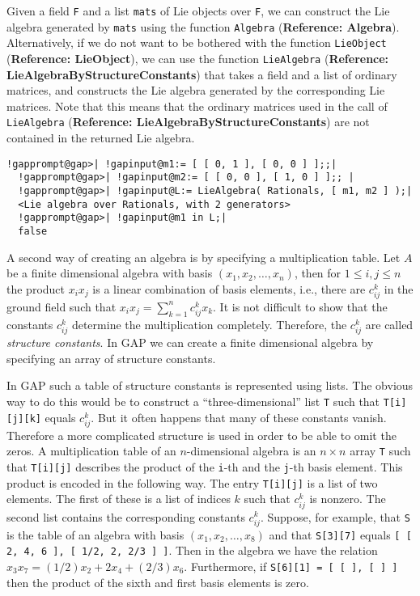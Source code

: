 \documentclass[a4paper,11pt]{report}
\begin{document}
{{ Given a field \texttt{F} and a list \texttt{mats} of Lie objects over \texttt{F}, we can construct the Lie algebra generated by \texttt{mats} using the function \texttt{Algebra} (\textbf{Reference: Algebra}). Alternatively, if we do not want to be bothered with the function \texttt{LieObject} (\textbf{Reference: LieObject}), we can use the function \texttt{LieAlgebra} (\textbf{Reference: LieAlgebraByStructureConstants}) that takes a field and a list of ordinary matrices, and constructs the Lie
algebra generated by the corresponding Lie matrices. Note that this means that
the ordinary matrices used in the call of \texttt{LieAlgebra} (\textbf{Reference: LieAlgebraByStructureConstants}) are not contained in the returned Lie algebra. 

 
\begin{Verbatim}[commandchars=!@|,fontsize=\small,frame=single,label=Example]
  !gapprompt@gap>| !gapinput@m1:= [ [ 0, 1 ], [ 0, 0 ] ];;|
  !gapprompt@gap>| !gapinput@m2:= [ [ 0, 0 ], [ 1, 0 ] ];; |
  !gapprompt@gap>| !gapinput@L:= LieAlgebra( Rationals, [ m1, m2 ] );|
  <Lie algebra over Rationals, with 2 generators>
  !gapprompt@gap>| !gapinput@m1 in L;|
  false
\end{Verbatim}
 

 A second way of creating an algebra is by specifying a multiplication table.
Let $A$ be a finite dimensional algebra with basis $(x_1, x_2, \ldots, x_n)$, then for $1 \leq i, j \leq n$ the product $x_i x_j$ is a linear combination of basis elements, i.e., there are $c_{ij}^k$ in the ground field such that $x_i x_j = \sum_{k=1}^n c_{ij}^k x_k.$ It is not difficult to show that the constants $c_{ij}^k$ determine the multiplication completely. Therefore, the $c_{ij}^k$ are called \emph{structure constants}. In \textsf{GAP} we can create a finite dimensional algebra by specifying an array of structure
constants. 

 In \textsf{GAP} such a table of structure constants is represented using lists. The obvious
way to do this would be to construct a ``three-dimensional'' list \texttt{T} such that \texttt{T[i][j][k]} equals $c_{ij}^k$. But it often happens that many of these constants vanish. Therefore a more
complicated structure is used in order to be able to omit the zeros. A
multiplication table of an $n$-dimensional algebra is an $n \times n$ array \texttt{T} such that \texttt{T[i][j]} describes the product of the \texttt{i}-th and the \texttt{j}-th basis element. This product is encoded in the following way. The entry \texttt{T[i][j]} is a list of two elements. The first of these is a list of indices $k$ such that $c_{ij}^k$ is nonzero. The second list contains the corresponding constants $c_{ij}^k$. Suppose, for example, that \texttt{S} is the table of an algebra with basis $(x_1, x_2, \ldots, x_8)$ and that \texttt{S[3][7]} equals \texttt{[ [ 2, 4, 6 ], [ 1/2, 2, 2/3 ] ]}. Then in the algebra we have the relation $x_3 x_7 = (1/2) x_2 + 2 x_4 + (2/3) x_6.$ Furthermore, if \texttt{S[6][1] = [ [ ], [ ] ]} then the product of the sixth and first basis elements is zero. 

}}
\end{document}
